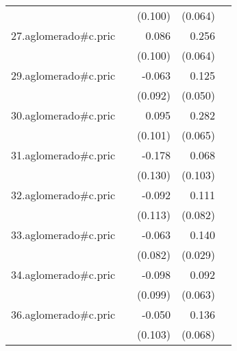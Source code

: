 {\begin{longtable}{l*{4}{D{.}{.}{-1}}}
            &                     &     (0.100)         &     (0.064)         &                     \\
\addlinespace
27.aglomerado#c.pric&                     &       0.086         &       0.256\sym{***}&                     \\
            &                     &     (0.100)         &     (0.064)         &                     \\
\addlinespace
29.aglomerado#c.pric&                     &      -0.063         &       0.125\sym{*}  &                     \\
            &                     &     (0.092)         &     (0.050)         &                     \\
\addlinespace
30.aglomerado#c.pric&                     &       0.095         &       0.282\sym{***}&                     \\
            &                     &     (0.101)         &     (0.065)         &                     \\
\addlinespace
31.aglomerado#c.pric&                     &      -0.178         &       0.068         &                     \\
            &                     &     (0.130)         &     (0.103)         &                     \\
\addlinespace
32.aglomerado#c.pric&                     &      -0.092         &       0.111         &                     \\
            &                     &     (0.113)         &     (0.082)         &                     \\
\addlinespace
33.aglomerado#c.pric&                     &      -0.063         &       0.140\sym{***}&                     \\
            &                     &     (0.082)         &     (0.029)         &                     \\
\addlinespace
34.aglomerado#c.pric&                     &      -0.098         &       0.092         &                     \\
            &                     &     (0.099)         &     (0.063)         &                     \\
\addlinespace
36.aglomerado#c.pric&                     &      -0.050         &       0.136\sym{*}  &                     \\
            &                     &     (0.103)         &     (0.068)         &                     \\

\end{longtable}}
